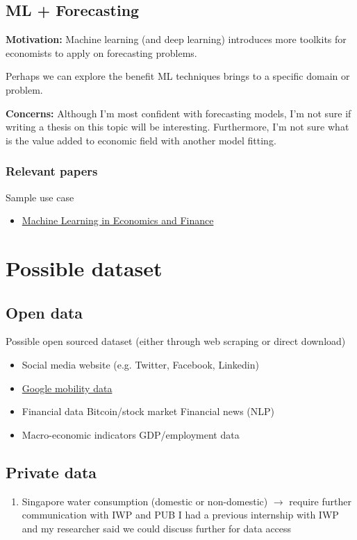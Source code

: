 \documentclass[11pt, oneside]{article}   	%
\begin{document}
    \subsection{ML + Forecasting}

    \textbf{Motivation:} Machine learning (and deep learning) introduces more toolkits for economists to apply on
    forecasting problems.

    Perhaps we can explore the benefit ML techniques brings to a specific domain or problem.

    \textbf{Concerns:} Although I'm most confident with forecasting models, I'm not sure if writing a thesis
    on this topic will be interesting. Furthermore, I'm not sure what is the value added to economic field
    with another model fitting.

    \subsubsection{Relevant papers}
    Sample use case
    \begin{itemize}
        \item \href{https://link-springer-com.libproxy1.nus.edu.sg/article/10.1007/s10614-021-10094-w}{Machine Learning
            in Economics and Finance}
    \end{itemize}

\section{Possible dataset}

    \subsection{Open data}

    Possible open sourced dataset (either through web scraping or direct download)

    \begin{itemize}
        \item Social media website (e.g. Twitter, Facebook, Linkedin)
        \item \href{https://www.google.com/covid19/mobility/}{Google mobility data}
        \item Financial data
            \subitem Bitcoin/stock market
            \subitem Financial news (NLP)
        \item Macro-economic indicators
            \subitem GDP/employment data
    \end{itemize}

    \subsection{Private data}

    \begin{enumerate}
        \item Singapore water consumption (domestic or non-domestic) $\rightarrow$ require further communication with
            IWP and PUB
            \subitem I had a previous internship with IWP and my researcher said we could discuss further for data
            access
    \end{enumerate}
\end{document}
